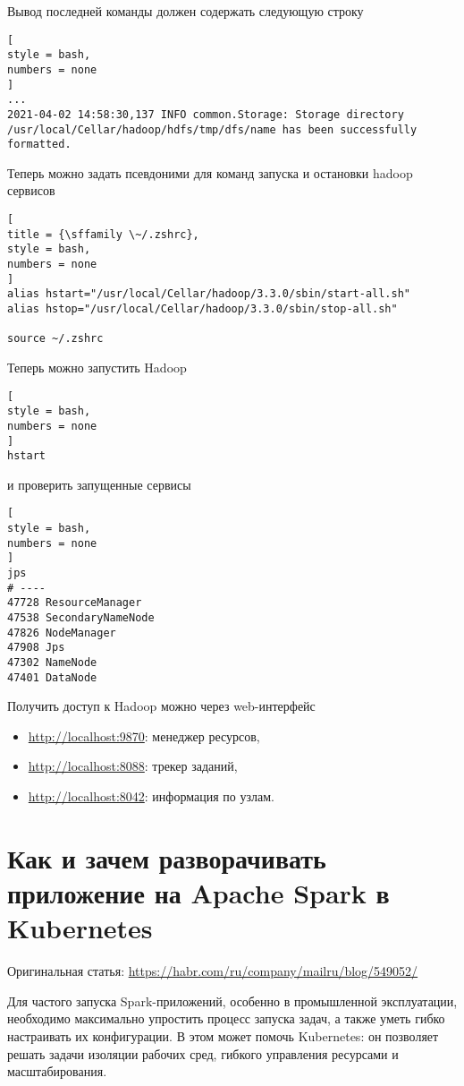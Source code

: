 \documentclass[%
	11pt,
	a4paper,
	utf8,
		]{article}
\begin{document}
Вывод последней команды должен содержать следующую строку
\begin{lstlisting}[
style = bash,
numbers = none	
]
...
2021-04-02 14:58:30,137 INFO common.Storage: Storage directory /usr/local/Cellar/hadoop/hdfs/tmp/dfs/name has been successfully formatted.
\end{lstlisting}

Теперь можно задать псевдоними для команд запуска и остановки hadoop сервисов
\begin{lstlisting}[
title = {\sffamily \~/.zshrc},
style = bash,
numbers = none	
]
alias hstart="/usr/local/Cellar/hadoop/3.3.0/sbin/start-all.sh"
alias hstop="/usr/local/Cellar/hadoop/3.3.0/sbin/stop-all.sh"

source ~/.zshrc
\end{lstlisting}

Теперь можно запустить Hadoop
\begin{lstlisting}[
style = bash,
numbers = none	
]
hstart
\end{lstlisting}
и проверить запущенные сервисы
\begin{lstlisting}[
style = bash,
numbers = none	
]
jps
# ----
47728 ResourceManager
47538 SecondaryNameNode
47826 NodeManager
47908 Jps
47302 NameNode
47401 DataNode
\end{lstlisting}

Получить доступ к Hadoop можно через web-интерфейс
\begin{itemize}
	\item \url{http://localhost:9870}: менеджер ресурсов,
	
	\item \url{http://localhost:8088}: трекер заданий,
	
	\item \url{http://localhost:8042}: информация по узлам.
\end{itemize}


\section{Как и зачем разворачивать приложение на Apache Spark в Kubernetes}

Оригинальная статья: \url{https://habr.com/ru/company/mailru/blog/549052/}

Для частого запуска Spark-приложений, особенно в промышленной эксплуатации, необходимо максимально упростить процесс запуска задач, а также уметь гибко настраивать их конфигурации. В этом может помочь Kubernetes: он позволяет решать задачи изоляции рабочих сред, гибкого управления ресурсами и масштабирования.
\end{document}
